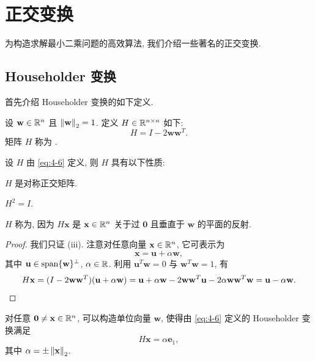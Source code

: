 \section{正交变换}
\label{sec:4-2}

为构造求解最小二乘问题的高效算法, 我们介绍一些著名的正交变换.

\subsection{Householder 变换}
\label{subsec:4-2-1}

首先介绍 Householder 变换的如下定义.

\begin{definition}
\label{def:4-3}
设 $\mathbf{w}\in\mathbb{R}^n$ 且 $\left\|\mathbf{w}\right\|_2=1$. 定义 $H\in\mathbb{R}^{n\times n}$ 如下:
\begin{equation}
  H=I-2\mathbf{w}\mathbf{w}^T.
  \label{eq:4-6}
\end{equation}
矩阵 $H$ 称为 .
\end{definition}

\begin{theorem}
\label{thm:4-7}
设 $H$ 由 \eqref{eq:4-6} 定义, 则 $H$ 具有以下性质:
\begin{romanlist}
  \item $H$ 是对称正交矩阵.
  \item $H^2=I$.
  \item $H$ 称为, 因为 $H\mathbf{x}$ 是 $\mathbf{x}\in\mathbb{R}^n$ 关于过 $\mathbf{0}$ 且垂直于 $\mathbf{w}$ 的平面的反射.
\end{romanlist}
\end{theorem}

\begin{proof}
我们只证 (iii). 注意对任意向量 $\mathbf{x}\in\mathbb{R}^n$, 它可表示为
\[
  \mathbf{x}=\mathbf{u}+\alpha\mathbf{w},
\]
其中 $\mathbf{u}\in\operatorname{span}\{\mathbf{w}\}^{\perp}$, $\alpha\in\mathbb{R}$. 利用 $\mathbf{u}^T\mathbf{w}=0$ 与 $\mathbf{w}^T\mathbf{w}=1$, 有
\[
  H\mathbf{x}=(I-2\mathbf{w}\mathbf{w}^T)(\mathbf{u}+\alpha\mathbf{w})
  =\mathbf{u}+\alpha\mathbf{w}-2\mathbf{w}\mathbf{w}^T\mathbf{u}
  -2\alpha\mathbf{w}\mathbf{w}^T\mathbf{w}
  =\mathbf{u}-\alpha\mathbf{w}. \qedhere
\]
\end{proof}

\begin{theorem}
\label{thm:4-8}
对任意 $\mathbf{0}\neq\mathbf{x}\in\mathbb{R}^n$, 可以构造单位向量 $\mathbf{w}$, 使得由 \eqref{eq:4-6} 定义的 Householder 变换满足
\[
  H\mathbf{x}=\alpha\mathbf{e}_1,
\]
其中 $\alpha=\pm\left\|\mathbf{x}\right\|_2$.
\end{theorem}

